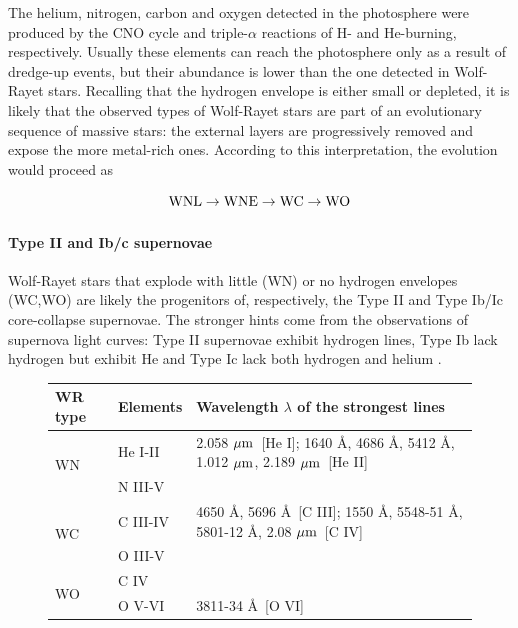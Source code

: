 \documentclass[a4paper,titlepage]{book}     	%
\begin{document}
The helium, nitrogen, carbon and oxygen detected in the photosphere were produced by the CNO cycle and triple-$\alpha$ reactions of H- and He-burning, respectively. Usually these elements can reach the photosphere only as a result of dredge-up events, but their abundance is lower than the one detected in Wolf-Rayet stars. Recalling that the hydrogen envelope is either small or depleted, it is likely that the observed types of Wolf-Rayet stars are part of an evolutionary sequence of massive stars: the external layers are progressively removed and expose the more metal-rich ones. According to this interpretation, the evolution would proceed as

\[\rm WNL \rightarrow WNE \rightarrow WC \rightarrow WO\]

\paragraph{Type II and Ib/c supernovae} Wolf-Rayet stars that explode with little (WN) or no hydrogen envelopes (WC,WO) are likely the progenitors of, respectively, the Type II and Type Ib/Ic core-collapse supernovae. The stronger hints come from the observations of supernova light curves: Type II supernovae exhibit hydrogen lines, Type Ib lack hydrogen but exhibit He and Type Ic lack both hydrogen and helium \cite{WR_signature,parsec2015_chen,Limongi2010_preSNevo}.

\renewcommand{\arraystretch}{1.5}
\begin{figure}[h]
	\centering
		\begin{tabular}{lll}
			\toprule
			WR type & Elements & Wavelength $\lambda$ of the strongest lines \\
			\midrule
			\multirow{2}{*}{WN}  & He I-II  & 2.058 $\mu\rm m$~[He I]; 1640 \AA , 4686 \AA, 5412 \AA, 1.012 $\mu\rm m$, 2.189 $\mu\rm m$~[He II]  \\
			& N III-V & \\ 
			\hline
			\multirow{2}{*}{WC}  & C III-IV  & 4650 \AA, 5696 \AA ~[C III]; 1550 \AA,  5548-51 \AA, 5801-12 \AA, 2.08 $\mu\rm m$~[C IV] \\
			& O III-V & \\
			\hline
			\multirow{2}{*}{WO}  & C IV  &\\
			& O V-VI & 3811-34 \AA~[O VI]\\
			\bottomrule 	
		\end{tabular}
		 \label{tab:WRclassification}
\end{figure}
\end{document}
